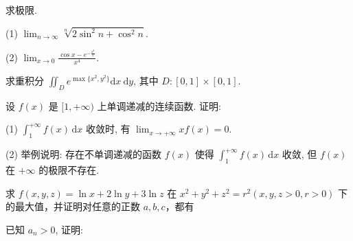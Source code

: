 \par{}
求极限.\par
(1) $\lim_{n\to \infty}\sqrt[n]{2\sin^2{n} + \cos^2{n}}.$\par
(2) $\lim_{x\to 0}\frac{\cos x - e^{-\frac{x^2}{2}}}{x^4}.$\par
\par{}
求重积分 $\iint_{D} e^{\max\{x^2, y^2\}} \mathrm{d}x \mathrm{~d}y$, 其中 $D: [0,1] \times [0,1]$.\par
\par{}
设 $f(x)$ 是 $[1, +\infty)$ 上单调递减的连续函数. 证明:\par
(1) $\int_{1}^{+\infty} f(x) \, \mathrm{d}x$ 收敛时, 有 $\lim_{x \to +\infty} x f(x) = 0$.\par
(2) 举例说明: 存在不单调递减的函数 $f(x)$ 使得 $\int_{1}^{+\infty} f(x) \, \mathrm{d}x$ 收敛, 但 $f(x)$ 在 $+\infty$ 的极限不存在.\par
\par{}
\par{}
求 $f(x, y, z) = \ln x + 2\ln y + 3\ln z$ 在 $x^2 + y^2 + z^2 = r^2 (x, y, z > 0, r > 0)$ 下的最大值，并证明对任意的正数 $a, b, c$，都有\par
\nopagebreak[4]
\par{}
\par{}
已知 $a_{n} > 0$, 证明:\par
\nopagebreak[4]
